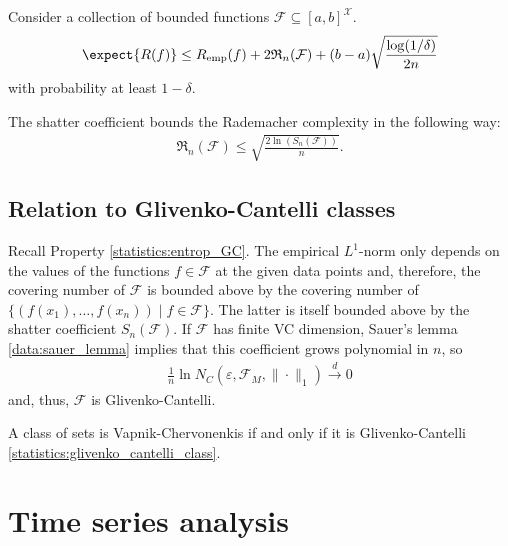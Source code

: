     \begin{property}
        Consider a collection of bounded functions $\mathcal{F}\subseteq[a,b]^\mathcal{X}$.
        \begin{gather}
            \expect{R(f)}\leq R_\mathrm{emp}(f)+2\mathfrak{R}_n(\mathcal{F})+(b-a)\sqrt{\frac{\log(1/\delta)}{2n}}
        \end{gather}
        with probability at least $1-\delta$.
    \end{property}

    \begin{property}[VC dimension]
        The shatter coefficient bounds the Rademacher complexity in the following way:
        \begin{gather}
            \mathfrak{R}_n(\mathcal{F})\leq\sqrt{\frac{2\ln(S_n(\mathcal{F}))}{n}}.
        \end{gather}
    \end{property}

\subsection{Relation to Glivenko-Cantelli classes}

    \begin{property}
        Recall Property \ref{statistics:entrop_GC}. The empirical $L^1$-norm only depends on the values of the functions $f\in\mathcal{F}$ at the given data points and, therefore, the covering number of $\mathcal{F}$ is bounded above by the covering number of $\{(f(x_1),\ldots,f(x_n))\mid f\in\mathcal{F}\}$. The latter is itself bounded above by the shatter coefficient $S_n(\mathcal{F})$. If $\mathcal{F}$ has finite VC dimension, Sauer's lemma \ref{data:sauer_lemma} implies that this coefficient grows polynomial in $n$, so
        \begin{gather}
            \frac{1}{n}\ln N_C(\varepsilon,\mathcal{F}_M,\|\cdot\|_1)\overset{d}{\longrightarrow}0
        \end{gather}
        and, thus, $\mathcal{F}$ is Glivenko-Cantelli.
    \end{property}

    \begin{theorem}
        A class of sets is Vapnik-Chervonenkis if and only if it is Glivenko-Cantelli \ref{statistics:glivenko_cantelli_class}.
    \end{theorem}

\section{Time series analysis}

